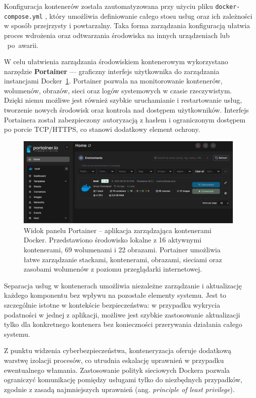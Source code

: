 \documentclass[
    left=2.5cm,         %
    right=2.5cm,        %
    top=2.5cm,          %
    bottom=3cm,         %
    bindingoffset=6mm,  %
    nohyphenation=true %
]{eiti/eiti-thesis} %
\begin{document}
Konfiguracja kontenerów została zautomatyzowana przy użyciu pliku \texttt{docker-compose.yml} \cite{lukaszfd_dockercompose2024}, który umożliwia definiowanie całego stosu usług oraz ich zależności w sposób przejrzysty i powtarzalny. Taka forma zarządzania konfiguracją ułatwia proces wdrożenia oraz odtwarzania środowiska na innych urządzeniach lub ~po~awarii.

W celu ułatwienia zarządzania środowiskiem kontenerowym wykorzystano narzędzie \textbf{Portainer} — graficzny interfejs użytkownika do zarządzania instancjami Docker~\ref{fig:portainer-dashboard}. Portainer pozwala na monitorowanie kontenerów, wolumenów, obrazów, sieci oraz logów systemowych w czasie rzeczywistym. Dzięki niemu możliwe jest również szybkie uruchamianie i restartowanie usług, tworzenie nowych środowisk oraz kontrola nad dostępem użytkowników. Interfejs Portainera został zabezpieczony autoryzacją z hasłem i ograniczonym dostępem po porcie TCP/HTTPS, co stanowi dodatkowy element ochrony.
\begin{figure}[H]
    \centering
    \includegraphics[width=\textwidth]{img/portainer.png}
    \caption{Widok panelu Portainer – aplikacja zarządzająca kontenerami Docker. Przedstawiono środowisko lokalne z 16 aktywnymi kontenerami, 69 wolumenami 
    i 22 obrazami. Portainer umożliwia łatwe zarządzanie stackami, kontenerami, obrazami, sieciami oraz zasobami wolumenów z poziomu przeglądarki internetowej.}
    \label{fig:portainer-dashboard}
\end{figure}


Separacja usług w kontenerach umożliwia niezależne zarządzanie i aktualizację każdego komponentu bez wpływu na pozostałe elementy systemu. Jest to szczególnie istotne w kontekście bezpieczeństwa: w przypadku wykrycia podatności w jednej z aplikacji, możliwe jest szybkie zastosowanie aktualizacji tylko dla konkretnego kontenera bez konieczności przerywania działania całego systemu.

Z punktu widzenia cyberbezpieczeństwa, konteneryzacja oferuje dodatkową warstwę izolacji procesów, co utrudnia eskalację uprawnień w przypadku ewentualnego włamania. Zastosowanie polityk sieciowych Dockera pozwala ograniczyć komunikację pomiędzy usługami tylko do niezbędnych przypadków, zgodnie z zasadą najmniejszych uprawnień (ang. \textit{principle of least privilege}).
\end{document}
